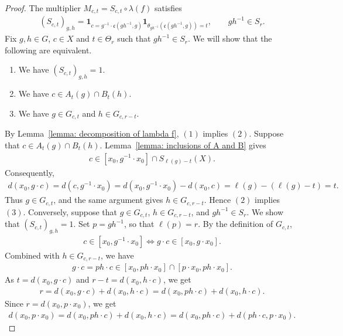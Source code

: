 \documentclass[12pt,reqno]{amsart}
\numberwithin{equation}{section}
\begin{document}
\begin{proof}
    The multiplier $M_{c,t}=S_{c,t}\circ \lambda(f)$ satisfies
    \begin{align*}
        (S_{c,t})_{g,h}=\mathbf{1}_{c=g^{-1}\cdot\mathfrak{c}(gh^{-1},g)}\mathbf{1}_{\theta_{gh^{-1}}(\mathfrak{c}(gh^{-1},g))=t},\qquad gh^{-1}\in S_r.
    \end{align*}
    Fix $g,h\in G$, $c\in X$ and $t\in \Theta_r$ such that $gh^{-1}\in S_r$. We will show that the following are equivalent. 
    \begin{enumerate}
        \item We have $(S_{c,t})_{g,h}=1$.
        \item We have $c\in A_t(g)\cap B_t(h)$.
        \item We have $g\in G_{c,t}$ and $h\in G_{c,r-t}$.
    \end{enumerate}
    By Lemma~\ref{lemma: decomposition of lambda f}, $(1)$ implies $(2)$.
    Suppose that $c\in A_t(g)\cap B_t(h)$. Lemma~\ref{lemma: inclusions of A and B} gives
    \begin{align*}
        c\in [x_0,g^{-1}\cdot x_0]\cap S_{\ell(g)-t}(X).
    \end{align*}
    Consequently,
    \begin{align*}
        d(x_0,g\cdot c)=d(c,g^{-1}\cdot x_0)=d(x_0,g^{-1}\cdot x_0)-d(x_0,c)=\ell(g)-(\ell(g)-t)=t.
    \end{align*}
    Thus $g\in G_{c,t}$, and the same argument gives $h\in G_{c,r-t}$. Hence $(2)$ implies $(3)$.
    Conversely, suppose that $g\in G_{c,t}$, $h\in G_{c,r-t}$, and $gh^{-1}\in S_r$. We show that $(S_{c,t})_{g,h}=1$. Set $p=gh^{-1}$, so that $\ell(p)=r$. By the definition of $G_{c,t}$,
    \begin{align*}
        c\in [x_0,g^{-1}\cdot x_0] \Leftrightarrow g\cdot c\in [x_0,g\cdot x_0].
    \end{align*}
    Combined with $h\in G_{c,r-t}$, we have
    \begin{align*}
        g\cdot c=ph\cdot c\in [x_0,ph\cdot x_0]\cap [p\cdot x_0, ph\cdot x_0].
    \end{align*}
    As $t=d(x_0,g\cdot c)$ and $r-t=d(x_0,h\cdot c)$, we get
    \begin{align*}
        r=d(x_0,g\cdot c)+d(x_0,h\cdot c)=d(x_0,ph\cdot c)+d(x_0,h\cdot c).
    \end{align*}
    Since $r=d(x_0,p\cdot x_0)$, we get
    \begin{align*}
        d(x_0,p\cdot x_0)=d(x_0,ph\cdot c)+d(x_0,h\cdot c)=d(x_0,ph\cdot c)+d(ph\cdot c,p\cdot x_0).

\end{align*}
\end{proof}
\end{document}
